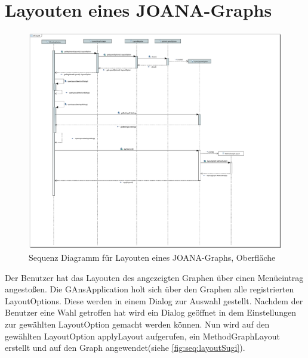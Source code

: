 \section{Layouten eines JOANA-Graphs}
\begin{figure}[!htbp]
	\centering
	\includegraphics[width=450pt]{resourcen/SeqDiagramLayout.PDF}
	\caption{Sequenz Diagramm für Layouten eines JOANA-Graphs, Oberfläche}
	\label{fig:seq:layout}
\end{figure}

Der Benutzer hat das Layouten des angezeigten Graphen über einen Menüeintrag angestoßen. Die GAnsApplication holt sich über den Graphen alle registrierten LayoutOptions. Diese werden in einem Dialog zur Auswahl gestellt. Nachdem der Benutzer eine Wahl getroffen hat wird ein Dialog geöffnet in dem Einstellungen zur gewählten LayoutOption gemacht werden können. Nun wird auf den gewählten LayoutOption applyLayout aufgerufen, ein MethodGraphLayout erstellt und auf den Graph angewendet(siehe \ref{fig:seq:layoutSugi}).
\newpage

